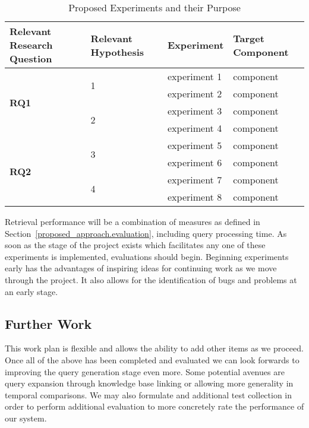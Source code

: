 \documentclass{mprop}
\begin{document}
\begin{table}[H]
\centering
\begin{tabular}{|p{2cm}|p{1cm}|p{6cm}|p{6cm}|}
\hline
Relevant Research Question & Relevant Hypothesis & Experiment & Target Component \\ \hline
\multirow{4}{*}{\textbf{RQ1}} & \multirow{2}{*}{1} & experiment 1 & component \\ \cline{3-4}
& & experiment 2 & component \\ \cline{2-4}
& \multirow{2}{*}{2} & experiment 3 & component \\ \cline{3-4}
& & experiment 4 & component \\ \cline {1-4}
\multirow{4}{*}{\textbf{RQ2}} & \multirow{2}{*}{3} & experiment 5 & component \\ \cline{3-4}
& & experiment 6 & component \\ \cline{2-4}
& \multirow{2}{*}{4} & experiment 7 & component \\ \cline{3-4}
& & experiment 8 & component \\ \cline {1-4}
\end{tabular}
\caption{Proposed Experiments and their Purpose}
\label{proposed_experiments}
\end{table}

Retrieval performance will be a combination of measures as defined in Section~\ref{proposed_approach.evaluation}, including query processing time.
As soon as the stage of the project exists which facilitates any one of these experiments is implemented, evaluations should begin.
Beginning experiments early has the advantages of inspiring ideas for continuing work as we move through the project.
It also allows for the identification of bugs and problems at an early stage.

\subsection{Further Work}
This work plan is flexible and allows the ability to add other items as we proceed. 
Once all of the above has been completed and evaluated we can look forwards to improving the query generation stage even more. 
Some potential avenues are query expansion through knowledge base linking or allowing more generality in temporal comparisons. 
We may also formulate and additional test collection in order to perform additional evaluation to more concretely rate the performance of our system.
\end{document}
